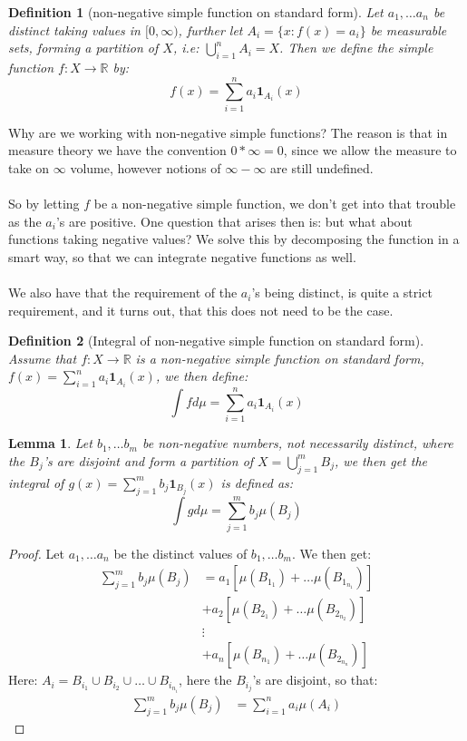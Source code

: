 \documentclass{article}
\newcommand{\R}{\mathbb{R}}
\newtheorem{definition}{Definition}
\newtheorem{lemma}{Lemma}
\newtheorem{proof}{Proof}
\begin{document}
\begin{definition}[non-negative simple function on standard form]
Let $a_{1}, \dots a_{n}$ be distinct taking values in $[0, \infty)$, further let $A_{i} = \{x:f(x) = a_{i}\}$ be measurable sets, forming a partition of $X$, i.e: $\bigcup_{i=1}^{n}A_{i} = X$. Then we define the simple function $f:X\to \R$ by: 
\[f(x) = \sum_{i=1}^{n}a_{i}\bm{1}_{A_{i}}(x)
\]
\end{definition}

Why are we working with non-negative simple functions? The reason is that in measure theory we have the convention $0*\infty = 0$, since we allow the measure to take on $\infty$ volume, however notions of $\infty - \infty$ are still undefined. 
\\~\\
So by letting $f$ be a non-negative simple function, we don't get into that trouble as the $a_{i}$'s are positive. One question that arises then is: but what about functions taking negative values? We solve this by decomposing the function in a smart way, so that we can integrate negative functions as well. 
\\~\\ 
We also have that the requirement of the $a_{i}$'s being distinct, is quite a strict requirement, and it turns out, that this does not need to be the case. 

\begin{definition}[Integral of non-negative simple function on standard form]
Assume that $f:X\to \R$ is a non-negative simple function on standard form, $f(x) = \sum_{i=1}^{n}a_{i}\bm{1}_{A_{i}}(x)$, we then define: 
\[\int f d\mu = \sum_{i=1}^{n}a_{i}\bm{1}_{A_{i}}(x)
\]
\end{definition}

\begin{lemma}
Let $b_{1}, \dots b_{m}$ be non-negative numbers, not necessarily distinct, where the $B_{j}$'s are disjoint and form a partition of $X = \bigcup_{j=1}^{m}B_{j}$, we then get the integral of $g(x) = \sum_{j=1}^{m}b_{j}\bm{1}_{B_{j}}(x)$ is defined as: 
\[\int g d\mu = \sum_{j=1}^{m}b_{j}\mu(B_{j})
\]
\end{lemma}

\begin{proof}
Let $a_{1}, \dots a_{n}$ be the distinct values of $b_{1}, \dots b_{m}$. We then get: 
\begin{align*}
\sum_{j=1}^{m}b_{j}\mu(B_{j}) &= a_{1}[\mu(B_{1_{1}}) + \dots \mu(B_{1_{n_{1}}})] \\ 
&+ a_{2}[\mu(B_{2_{1}}) + \dots \mu(B_{2_{n_{2}}})] \\ 
&\vdots \\ 
&+ a_{n}[\mu(B_{n_{1}}) + \dots \mu(B_{2_{n_{n}}})]
\end{align*}
Here: $A_{i} = B_{i_{1}}\cup B_{i_{2}}\cup \dots \cup B_{i_{n_{i}}}$, here the $B_{i_{j}}$'s are disjoint, so that: 
\begin{align*}
\sum_{j=1}^{m}b_{j}\mu(B_{j}) &= \sum_{i=1}^{n}a_{i}\mu(A_{i})
\end{align*}
\end{proof}
\end{document}
